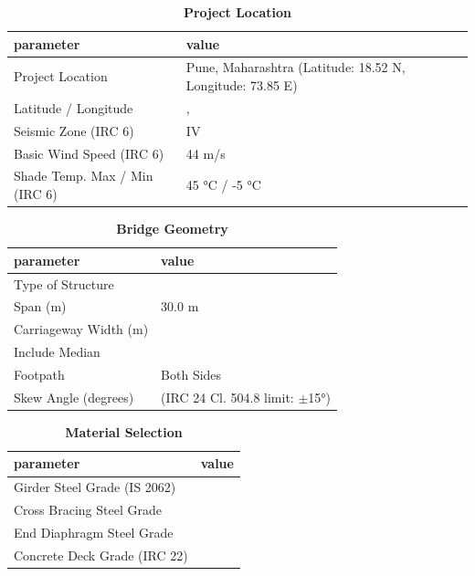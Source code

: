 \documentclass[12pt,a4paper]{report}
\numberwithin{table}{chapter}
\numberwithin{figure}{chapter}
\begin{document}
\begin{table}[H]
\caption{\textbf{Project Location}}
\label{subsec:project-location}
\begin{tabular}{|L{5.5cm}|L{8.5cm}|}
\hline
\textbf{parameter} & \textbf{value} \\
\hline
\textnormal{Project Location} & Pune, Maharashtra (Latitude:\allowbreak{} 18.52 N, Longitude:\allowbreak{} 73.85 E) \\
\hline
\textnormal{Latitude / Longitude} & ,  \\
\hline
\textnormal{Seismic Zone (IRC 6)} & IV \\
\hline
\textnormal{Basic Wind Speed (IRC 6)} & 44 m/s \\
\hline
\textnormal{Shade Temp. Max / Min (IRC 6)} & 45 °C / -5 °C \\
\hline
\end{tabular}
\vspace{0.4cm}
\end{table}

\begin{table}[H]
\caption{\textbf{Bridge Geometry}}
\label{subsec:bridge-geometry}
\begin{tabular}{|L{5.5cm}|L{8.5cm}|}
\hline
\textbf{parameter} & \textbf{value} \\
\hline
\textnormal{Type of Structure} &  \\
\hline
\textnormal{Span (m)} & 30.0 m \\
\hline
\textnormal{Carriageway Width (m)} &  \\
\hline
\textnormal{Include Median} &  \\
\hline
\textnormal{Footpath} & Both Sides \\
\hline
\textnormal{Skew Angle (degrees)} &  (IRC 24 Cl. 504.8 limit: $\pm$15°) \\
\hline
\end{tabular}
\end{table}
\vspace{0.4cm}

\begin{table}[H]
\caption{\textbf{Material Selection}}
\label{subsec:material}
\begin{tabular}{|L{5.5cm}|L{8.5cm}|}
\hline
\textbf{parameter} & \textbf{value} \\
\hline
\textnormal{Girder Steel Grade (IS 2062)} &  \\
\hline
\textnormal{Cross Bracing Steel Grade} &  \\
\hline
\textnormal{End Diaphragm Steel Grade} &  \\
\hline
\textnormal{Concrete Deck Grade (IRC 22)} &  \\
\hline
\end{tabular}
\end{table}
\vspace{0.4cm}
\end{document}
